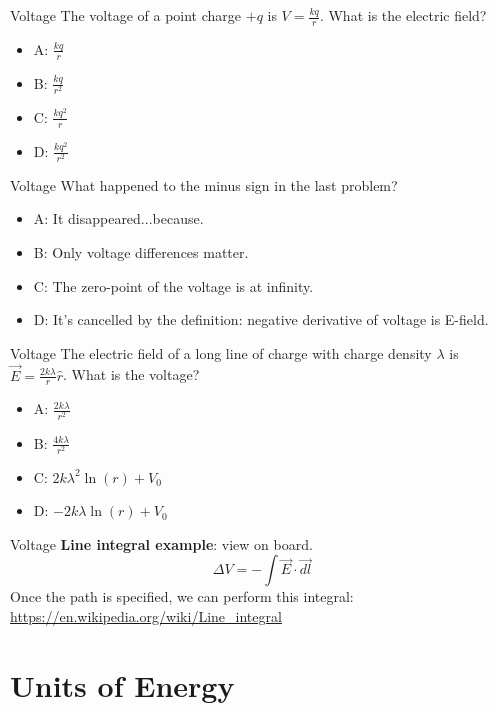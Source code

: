 \documentclass{beamer}
\begin{document}
\begin{frame}{Voltage}
The voltage of a point charge $+q$ is $V = \frac{kq}{r}$.  What is the electric field?
\begin{itemize}
\item A: $\frac{kq}{r}$
\item B: $\frac{kq}{r^2}$
\item C: $\frac{kq^2}{r}$
\item D: $\frac{kq^2}{r^2}$
\end{itemize}
\end{frame}

\begin{frame}{Voltage}
What happened to the minus sign in the last problem?
\begin{itemize}
\item A: It disappeared...because.
\item B: Only voltage differences matter.
\item C: The zero-point of the voltage is at infinity.
\item D: It's cancelled by the definition: negative derivative of voltage is E-field.
\end{itemize}
\end{frame}

\begin{frame}{Voltage}
The electric field of a long line of charge with charge density $\lambda$ is $\vec{E} = \frac{2k\lambda}{r}\hat{r}$.  What is the voltage?
\begin{itemize}
\item A: $\frac{2k\lambda}{r^2}$
\item B: $\frac{4k\lambda}{r^2}$
\item C: $2k\lambda^2\ln(r) + V_0$
\item D: $-2k\lambda\ln(r) + V_0$
\end{itemize}
\end{frame}

\begin{frame}{Voltage}
\textbf{Line integral example}: view on board.
\begin{equation}
\Delta V = -\int \vec{E} \cdot \vec{dl}
\end{equation}
Once the path is specified, we can perform this integral: \url{https://en.wikipedia.org/wiki/Line_integral}
\end{frame}

\section{Units of Energy}
\end{document}
